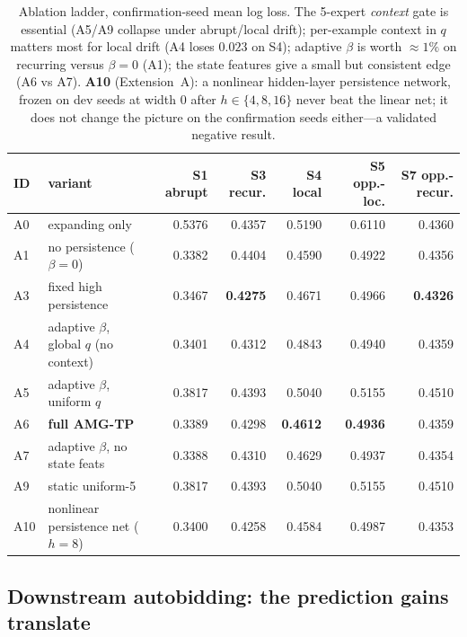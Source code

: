 \documentclass[11pt]{article}
\begin{document}
\begin{table}[H]
\centering
\footnotesize
\setlength{\tabcolsep}{5pt}
\begin{tabular}{@{}llrrrrr@{}}
\toprule
ID & variant & S1 abrupt & S3 recur. & S4 local & S5 opp.-loc. & S7 opp.-recur. \\
\midrule
A0 & expanding only            & 0.5376 & 0.4357 & 0.5190 & 0.6110 & 0.4360 \\
A1 & no persistence ($\beta{=}0$) & 0.3382 & 0.4404 & 0.4590 & 0.4922 & 0.4356 \\
A3 & fixed high persistence    & 0.3467 & \textbf{0.4275} & 0.4671 & 0.4966 & \textbf{0.4326} \\
A4 & adaptive $\beta$, global $q$ (no context) & 0.3401 & 0.4312 & 0.4843 & 0.4940 & 0.4359 \\
A5 & adaptive $\beta$, uniform $q$ & 0.3817 & 0.4393 & 0.5040 & 0.5155 & 0.4510 \\
A6 & \textbf{full AMG-TP}      & 0.3389 & 0.4298 & \textbf{0.4612} & \textbf{0.4936} & 0.4359 \\
A7 & adaptive $\beta$, no state feats & 0.3388 & 0.4310 & 0.4629 & 0.4937 & 0.4354 \\
A9 & static uniform-5          & 0.3817 & 0.4393 & 0.5040 & 0.5155 & 0.4510 \\
A10 & nonlinear persistence net ($h{=}8$) & 0.3400 & 0.4258 & 0.4584 & 0.4987 & 0.4353 \\
\bottomrule
\end{tabular}
\caption{Ablation ladder, confirmation-seed mean log loss. The 5-expert
\emph{context} gate is essential (A5/A9 collapse under abrupt/local drift);
per-example context in $q$ matters most for local drift (A4 loses $0.023$ on
S4); adaptive $\beta$ is worth $\approx1\%$ on recurring versus $\beta{=}0$ (A1);
the state features give a small but consistent edge (A6 vs A7). \textbf{A10}
(Extension~A): a nonlinear hidden-layer persistence network, frozen on dev
seeds at width 0 after $h\in\{4,8,16\}$ never beat the linear net; it does not
change the picture on the confirmation seeds either---a validated negative
result.}
\end{table}

\subsection{Downstream autobidding: the prediction gains translate}
\end{document}
